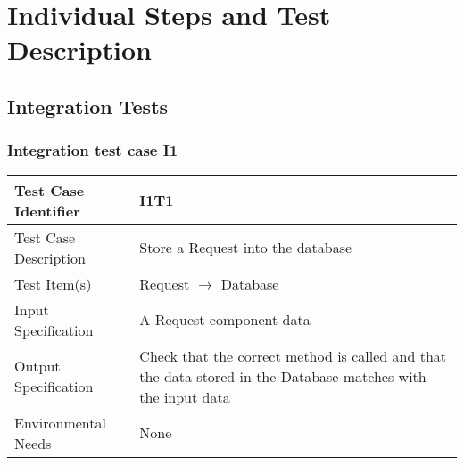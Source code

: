 \section{Individual Steps and Test Description}
	\subsection{Integration Tests}
		\subsubsection{Integration test case I1}
		\begin{center}
			\begin{tabular}{ |l p{10cm}| } \hline
				Test Case Identifier & I1T1 \\ \hline
				Test Case Description & Store a Request into the database \\ \hline
				Test Item(s) & Request $\rightarrow$ Database \\ \hline
				Input Specification & A Request component data \\ \hline
				Output Specification & Check that the correct method is called and that the data stored in the Database
				matches with the input data \\ \hline
				Environmental Needs & None \\ \hline
			\end{tabular}
		\end{center}
